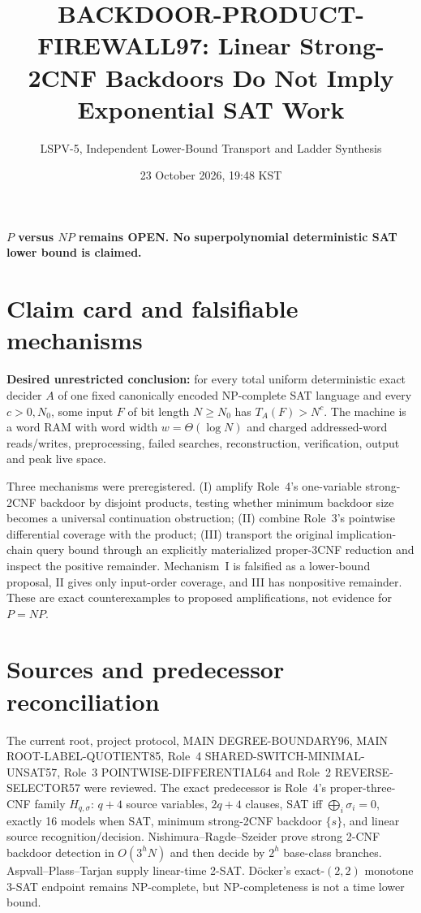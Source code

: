 \documentclass[11pt]{article}
\title{BACKDOOR-PRODUCT-FIREWALL97: Linear Strong-2CNF Backdoors Do Not Imply Exponential SAT Work}
\author{LSPV-5, Independent Lower-Bound Transport and Ladder Synthesis}
\date{23 October 2026, 19:48 KST}
\begin{document}
\maketitle
\begin{center}\textbf{$P$ versus $NP$ remains OPEN. No superpolynomial deterministic SAT lower bound is claimed.}\end{center}

\section{Claim card and falsifiable mechanisms}
\textbf{Desired unrestricted conclusion:} for every total uniform deterministic exact decider $A$ of one fixed canonically encoded NP-complete SAT language and every $c>0,N_0$, some input $F$ of bit length $N\ge N_0$ has $T_A(F)>N^c$.  The machine is a word RAM with word width $w=\Theta(\log N)$ and charged addressed-word reads/writes, preprocessing, failed searches, reconstruction, verification, output and peak live space.

Three mechanisms were preregistered.  (I) amplify Role~4's one-variable strong-2CNF backdoor by disjoint products, testing whether minimum backdoor size becomes a universal continuation obstruction; (II) combine Role~3's pointwise differential coverage with the product; (III) transport the original implication-chain query bound through an explicitly materialized proper-3CNF reduction and inspect the positive remainder.  Mechanism~I is falsified as a lower-bound proposal, II gives only input-order coverage, and III has nonpositive remainder.  These are exact counterexamples to proposed amplifications, not evidence for $P=NP$.

\section{Sources and predecessor reconciliation}
The current root, project protocol, MAIN DEGREE-BOUNDARY96, MAIN ROOT-LABEL-QUOTIENT85, Role~4 SHARED-SWITCH-MINIMAL-UNSAT57, Role~3 POINTWISE-DIFFERENTIAL64 and Role~2 REVERSE-SELECTOR57 were reviewed.  The exact predecessor is Role~4's proper-three-CNF family $H_{q,\sigma}$: $q+4$ source variables, $2q+4$ clauses, SAT iff $\bigoplus_i\sigma_i=0$, exactly 16 models when SAT, minimum strong-2CNF backdoor $\{s\}$, and linear source recognition/decision.  Nishimura--Ragde--Szeider prove strong 2-CNF backdoor detection in $O(3^hN)$ and then decide by $2^h$ base-class branches.  Aspvall--Plass--Tarjan supply linear-time 2-SAT.  D\"ocker's exact-$(2,2)$ monotone 3-SAT endpoint remains NP-complete, but NP-completeness is not a time lower bound.
\end{document}
